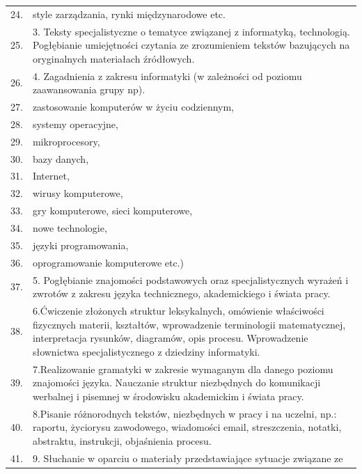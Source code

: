 \documentclass[12pt, a4paper]{article}
\begin{document}
{\begin{longtable}{m{1.5cm}m{14.5cm}}
  \rowcolor{tableRowAlt} 24. & style zarządzania,  rynki międzynarodowe etc. \\
  \rowcolor{tableRowLight} 25. & 3. Teksty specjalistyczne o tematyce związanej z informatyką, technologią.  Pogłębianie umiejętności czytania ze zrozumieniem tekstów bazujących na oryginalnych materiałach źródłowych. \\
  \rowcolor{tableRowAlt} 26. & 4. Zagadnienia z zakresu informatyki (w zależności od poziomu zaawansowania grupy np). \\
  \rowcolor{tableRowLight} 27. & zastosowanie komputerów w życiu codziennym, \\
  \rowcolor{tableRowAlt} 28. & systemy operacyjne, \\
  \rowcolor{tableRowLight} 29. & mikroprocesory, \\
  \rowcolor{tableRowAlt} 30. & bazy danych, \\
  \rowcolor{tableRowLight} 31. & Internet, \\
  \rowcolor{tableRowAlt} 32. & wirusy komputerowe, \\
  \rowcolor{tableRowLight} 33. & gry komputerowe, sieci komputerowe, \\
  \rowcolor{tableRowAlt} 34. & nowe technologie, \\
  \rowcolor{tableRowLight} 35. & języki programowania, \\
  \rowcolor{tableRowAlt} 36. & oprogramowanie komputerowe etc.) \\
  \rowcolor{tableRowLight} 37. & 5. Pogłębianie znajomości podstawowych oraz specjalistycznych wyrażeń i zwrotów z zakresu języka technicznego, akademickiego i świata pracy. \\
  \rowcolor{tableRowAlt} 38. & 6.Ćwiczenie złożonych struktur leksykalnych, omówienie właściwości fizycznych materii, kształtów, wprowadzenie terminologii matematycznej, interpretacja rysunków, diagramów, opis procesu. Wprowadzenie słownictwa specjalistycznego z dziedziny informatyki. \\
  \rowcolor{tableRowLight} 39. & 7.Realizowanie gramatyki w zakresie wymaganym dla danego poziomu znajomości języka. Nauczanie struktur niezbędnych do komunikacji werbalnej i pisemnej w środowisku akademickim i świata pracy. \\
  \rowcolor{tableRowAlt} 40. & 8.Pisanie różnorodnych tekstów, niezbędnych w pracy i na uczelni, np.: raportu, życiorysu zawodowego, wiadomości email, streszczenia, notatki, abstraktu, instrukcji, objaśnienia procesu. \\
  \rowcolor{tableRowLight} 41. & 9. Słuchanie w oparciu o materiały przedstawiające sytuacje związane ze \\

\end{longtable}}
\end{document}
